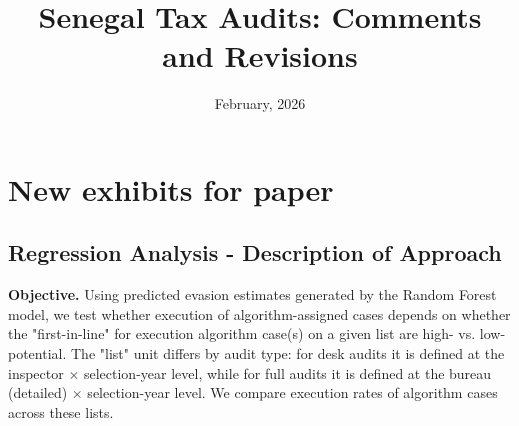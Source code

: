 \documentclass{article}
\title{Senegal Tax Audits: Comments and Revisions}
\date{February, 2026}
\begin{document}
\maketitle
\tableofcontents
\listoffigures
\listoftables

\newpage
\section{New exhibits for paper}

\subsection{Regression Analysis - Description of Approach}

\textbf{Objective.} Using predicted evasion estimates generated by the Random Forest model, we test whether execution of algorithm-assigned cases depends on whether the "first-in-line" for execution algorithm case(s) on a given list are high- vs. low-potential. The "list" unit differs by audit type: for desk audits it is defined at the inspector $\times$ selection-year level, while for full audits it is defined at the bureau (detailed) $\times$ selection-year level. We compare execution rates of algorithm cases across these lists.
\end{document}
